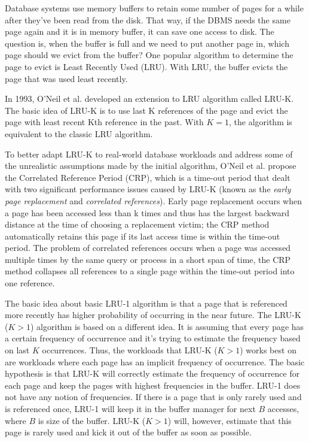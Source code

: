 Database systems use memory buffers to retain some number of pages for a while after they've been read from the disk. That way, if the DBMS needs the same page again and it is in memory buffer, it can save one access to disk. The question is, when the buffer is full and we need to put another page in, which page should we evict from the buffer? One popular algorithm to determine the page to evict is Least Recently Used (LRU). With LRU, the buffer evicts the page that was used least recently.

In 1993, O'Neil et al. \cite{lruk} developed an extension to LRU algorithm called LRU-K. The basic idea of LRU-K is to use last K references of the page and evict the page with least recent Kth reference in the past. With $K = 1$, the algorithm is equivalent to the classic LRU algorithm.

To better adapt LRU-K to real-world database workloads and address some of the unrealistic assumptions made by the initial algorithm, O'Neil et al. propose the Correlated Reference Period (CRP), which is a time-out period that dealt with two significant performance issues caused by LRU-K (known as the \emph{early page replacement} and \emph{correlated references}). Early page replacement occurs when a page has been accessed less than k times and thus has the largest backward distance at the time of choosing a replacement victim; the CRP method automatically retains this page if its last access time is within the time-out period. The problem of correlated references occurs when a page was accessed multiple times by the same query or process in a short span of time, the CRP method collapses all references to a single page within the time-out period into one reference.

The basic idea about basic LRU-1 algorithm is that a page that is referenced more recently has higher probability of occurring in the near future. The LRU-K ($K > 1$) algorithm is based on a different idea. It is assuming that every page has a certain frequency of occurrence and it's trying to estimate the frequency based on last $K$ occurrences. Thus, the workloads that LRU-K ($K > 1$) works best on are workloads where each page has an implicit frequency of occurrence. The basic hypothesis is that LRU-K will correctly estimate the frequency of occurrence for each page and keep the pages with highest frequencies in the buffer. LRU-1 does not have any notion of frequencies. If there is a page that is only rarely used and is referenced once, LRU-1 will keep it in the buffer manager for next $B$ accesses, where $B$ is size of the buffer. LRU-K ($K > 1$) will, however, estimate that this page is rarely used and kick it out of the buffer as soon as possible.

